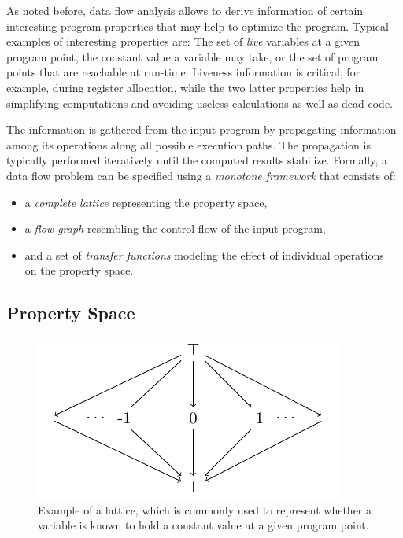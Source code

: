 As noted before, data flow analysis allows to derive information of certain
interesting program properties that may help to optimize the program. Typical
examples of interesting properties are: The set of \emph{live} variables at a
given program point, the constant value a variable may take, or the set of
program points that are reachable at run-time. Liveness information is critical,
for example, during register allocation, while the two latter properties help
in simplifying computations and avoiding useless calculations as well as dead
code.

The information is gathered from the input program by propagating information
among its operations along all possible execution paths. The
propagation is typically performed iteratively until the computed results
stabilize. Formally, a data flow problem can be specified using a \emph{monotone
framework} that consists of:
\begin{itemize}
  \item a \emph{complete lattice} representing the property space,
  \item a \emph{flow graph} resembling the control flow of the input program,
  \item and a set of \emph{transfer functions} modeling the effect of individual
        operations \\ on the property space.
\end{itemize}

\subsection{Property Space}
\label{novillo:sec:property_space}

\begin{figure}[t]
  \begin{center}
    \includegraphics{constprop_lattice}
  \end{center}
  \vspace{-1em}
  \caption{Example of a lattice, which is commonly used to represent whether a
           variable is known to hold a constant value at a given program point.}
  \label{novillo:fig:lattice_constant_propagation}
\end{figure}

